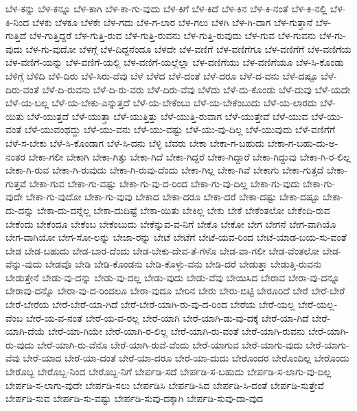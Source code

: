 {ಬೆಳ-ಕನ್ನು
ಬೆಳ-ಕನ್ನೂ
ಬೆಳ-ಕಾಗಿ
ಬೆಳ-ಕಾ-ಗು-ವುದು
ಬೆಳ-ಕಿಗೆ
ಬೆಳ-ಕಿದೆ
ಬೆಳ-ಕಿನ
ಬೆಳ-ಕಿ-ನಂತೆ
ಬೆಳ-ಕಿ-ನಲ್ಲಿ
ಬೆಳ-ಕಿ-ನಿಂದ
ಬೆಳಕು
ಬೆಳಕೂ
ಬೆಳಕೇ
ಬೆಳ-ಗದು
ಬೆಳ-ಗ-ಲಾರ
ಬೆಳ-ಗಲು
ಬೆಳಗಿ
ಬೆಳ-ಗಿ-ದಾಗ
ಬೆಳ-ಗುತ್ತಾನೆ
ಬೆಳ-ಗುತ್ತಿದೆ
ಬೆಳ-ಗುತ್ತಿದ್ದರೆ
ಬೆಳ-ಗುತ್ತಿ-ರುವ
ಬೆಳ-ಗುತ್ತಿ-ರುವನು
ಬೆಳ-ಗುತ್ತಿ-ರುವುದು
ಬೆಳ-ಗುವ
ಬೆಳ-ಗುವನು
ಬೆಳ-ಗು-ವುದು
ಬೆಳ-ಗು-ವುದೋ
ಬೆಳಗ್ಗೆ
ಬೆಳ-ದಿದ್ದನೆಂದೂ
ಬೆಳದೇ
ಬೆಳ-ವಣಿಗೆ
ಬೆಳ-ವಣಿಗೆಗೂ
ಬೆಳ-ವಣಿಗೆಗೆ
ಬೆಳ-ವಣಿಗೆಯ
ಬೆಳ-ವಣಿಗೆ-ಯನ್ನು
ಬೆಳ-ವಣಿಗೆ-ಯಲ್ಲಿ
ಬೆಳ-ವಣಿಗೆ-ಯಲ್ಲೆಲ್ಲಾ
ಬೆಳ-ವಣಿಗೆಯು
ಬೆಳ-ವಣಿಗೆಯೂ
ಬೆಳ-ಸಿ-ಕೊಂಡು
ಬೆಳಿಗ್ಗೆ
ಬೆಳಿದಿ
ಬೆಳಿ-ದಿರು
ಬೆಳಿ-ಸಿರು-ವೆವು
ಬೆಳೆ
ಬೆಳೆದ
ಬೆಳೆ-ದಂತೆ
ಬೆಳೆ-ದರೂ
ಬೆಳೆ-ದ-ವನು
ಬೆಳೆ-ದಷ್ಟೂ
ಬೆಳೆ-ದಿರು-ವಂತೆ
ಬೆಳೆ-ದಿ-ರುವನು
ಬೆಳೆ-ದಿ-ರು-ವರು
ಬೆಳೆ-ದಿರು-ವೆವು
ಬೆಳೆದು
ಬೆಳೆ-ದು-ಕೊಂಡು
ಬೆಳೆ-ದುವು
ಬೆಳೆ-ಯದೇ
ಬೆಳೆ-ಯ-ಬಲ್ಲ
ಬೆಳೆ-ಯ-ಬೇಕು-ಎನ್ನುತ್ತದೆ
ಬೆಳೆ-ಯ-ಬೇಕೆಂಬು
ಬೆಳೆ-ಯ-ಬೇಕೆಂಬುದು
ಬೆಳೆ-ಯ-ಲಾರದು
ಬೆಳೆ-ಯಿತು
ಬೆಳೆ-ಯುತ್ತದೆ
ಬೆಳೆ-ಯುತ್ತಾ
ಬೆಳೆ-ಯುತ್ತಿತ್ತು
ಬೆಳೆ-ಯುತ್ತಿ-ರುವಾಗ
ಬೆಳೆ-ಯುತ್ತೇವೆ
ಬೆಳೆ-ಯುವ
ಬೆಳೆ-ಯು-ವಂತೆ
ಬೆಳೆ-ಯುವಂಥದ್ದು
ಬೆಳೆ-ಯು-ವನು
ಬೆಳೆ-ಯು-ವಷ್ಟು
ಬೆಳೆ-ಯು-ವು-ದಿಲ್ಲ
ಬೆಳೆ-ಯುವುದು
ಬೆಳೆ-ವಣಿಗೆಗೆ
ಬೆಳೆ-ಸ-ಬೇಕು
ಬೆಳೆ-ಸಿ-ಕೊಂಡಾಗ
ಬೆಳೆ-ಸಿ-ದನು
ಬೆಳ್ಳಿ
ಬೆವರು
ಬೇಕಾ
ಬೇಕಾ-ಗ-ಬಹುದು
ಬೇಕಾ-ಗ-ಬಹು-ದು-ಅ-ನಂತರ
ಬೇಕಾ-ಗಲೀ
ಬೇಕಾಗಿ
ಬೇಕಾ-ಗಿತ್ತು
ಬೇಕಾ-ಗಿದೆ
ಬೇಕಾ-ಗಿದ್ದರೆ
ಬೇಕಾ-ಗಿದ್ದಾರೆ
ಬೇಕಾ-ಗಿದ್ದುವು
ಬೇಕಾ-ಗಿ-ರ-ಲಿಲ್ಲ
ಬೇಕಾ-ಗಿ-ರುವ
ಬೇಕಾ-ಗಿ-ರುವುದು
ಬೇಕಾ-ಗಿ-ರುವು-ದೆಂದು
ಬೇಕಾ-ಗಿಲ್ಲ
ಬೇಕಾ-ಗಿವೆ
ಬೇಕಾಗು
ಬೇಕಾ-ಗುತ್ತದೆ
ಬೇಕಾ-ಗುತ್ತವೆ
ಬೇಕಾ-ಗುವ
ಬೇಕಾ-ಗು-ವಷ್ಟು
ಬೇಕಾ-ಗು-ವು-ದ-ರಿಂದ
ಬೇಕಾ-ಗು-ವು-ದಿಲ್ಲ
ಬೇಕಾ-ಗು-ವುದು
ಬೇಕಾ-ಗು-ವುದೇ
ಬೇಕಾ-ಗು-ವುದೋ
ಬೇಕಾ-ಗು-ವುವು
ಬೇಕಾದ
ಬೇಕಾ-ದರೂ
ಬೇಕಾ-ದರೆ
ಬೇಕಾ-ದಷ್ಟು
ಬೇಕಾ-ದಷ್ಟೂ
ಬೇಕಾ-ದು-ದನ್ನು
ಬೇಕಾ-ದು-ದನ್ನೆಲ್ಲ
ಬೇಕಾ-ದುದಿಷ್ಟೆ
ಬೇಕಾ-ಯಿತು
ಬೇಕಿಲ್ಲ
ಬೇಕು
ಬೇಕೆ
ಬೇಕೆಂತಲೋ
ಬೇಕೆಂದಿ-ರುವ
ಬೇಕೆಂದು
ಬೇಕೆಂದೂ
ಬೇಕೆಂಬ
ಬೇಕೆಂಬುದು
ಬೇಕೆನ್ನುವ-ವ-ನಿಗೆ
ಬೇಕೊ
ಬೇಕೋ
ಬೇಗ
ಬೇಗನೆ
ಬೇಗ-ವಾಗಿಯೊ
ಬೇಗ-ವಾಗಿಯೋ
ಬೇಗ-ಸೋ-ಲನ್ನು
ಬೇಜಾ-ರನ್ನು
ಬೇಟೆ
ಬೇಟೆಗೆ
ಬೇಟೆ-ಯವ-ರಿಂದ
ಬೇಟೆ-ಯಾಡ-ಬಯ-ಸು-ವಂತೆ
ಬೇಡ
ಬೇಡ-ಬಹುದು
ಬೇಡ-ಬಾರ-ದೆಂದು
ಬೇಡ-ಬೇಕು-ದೇವ-ತೆ-ಗಳೊ
ಬೇಡ-ವಾ-ಗಲೀ
ಬೇಡ-ವೆಂತಲೋ
ಬೇಡ-ವೆನ್ನು-ವುದು
ಬೇಡವೊ
ಬೇಡಿ
ಬೇಡಿ-ಕೊಂಡನು
ಬೇಡಿ-ಕೊಳ್ಳು-ವನು
ಬೇಡಿ-ದರೆ
ಬೇಡುತ್ತಾ
ಬೇಡುತ್ತಿ-ರುವನು
ಬೇಡುತ್ತೇನೆ
ಬೇಡು-ವು-ದನ್ನು
ಬೇಡು-ವು-ದಲ್ಲ
ಬೇಡು-ವುದು
ಬೇಡು-ವೆವು
ಬೇಯಿಸಿದ
ಬೇರಾವ
ಬೇರಾ-ವು-ದನ್ನೂ
ಬೇರಾವು-ದನ್ನೊ
ಬೇರಾ-ವು-ದ-ರಿಂದಲೂ
ಬೇರಾ-ವುದೂ
ಬೇರಿನ
ಬೇರು
ಬೇರು-ಬಿಟ್ಟಿ
ಬೇರೂರಿದೆ
ಬೇರೆ
ಬೇರೆ-ಬೇರೆ
ಬೇರೆ-ಬೇರೆಯ
ಬೇರೆ-ಬೇರೆ-ಯಾ-ಗಿದೆ
ಬೇರೆ-ಬೇರೆ-ಯಾಗಿ-ರು-ವು-ದ-ರಿಂದ
ಬೇರೆಯ
ಬೇರೆ-ಯಲ್ಲ
ಬೇರೆ-ಯಲ್ಲ-ವೆಂಬ
ಬೇರೆ-ಯ-ವ-ನಂತೆ
ಬೇರೆ-ಯ-ವ-ರಲ್ಲ
ಬೇರೆ-ಯಾಗಿ
ಬೇರೆ-ಯಾಗಿ-ಡು-ವು-ದಕ್ಕೆ
ಬೇರೆ-ಯಾ-ಗಿದೆ
ಬೇರೆ-ಯಾಗಿ-ದೆಯೆ
ಬೇರೆ-ಯಾ-ಗಿಯೇ
ಬೇರೆ-ಯಾಗಿ-ರ-ಲಿಲ್ಲ
ಬೇರೆ-ಯಾಗಿ-ರು-ವಂತೆ
ಬೇರೆ-ಯಾಗಿ-ರುವನು
ಬೇರೆ-ಯಾಗಿ-ರು-ವುದು
ಬೇರೆ-ಯಾಗಿ-ರು-ವೆನೊ
ಬೇರೆ-ಯಾಗಿ-ರುವೆ-ವೆಂದು
ಬೇರೆ-ಯಾಗುವ
ಬೇರೆ-ಯಾಗು-ವುದು
ಬೇರೆ-ಯಾಗು-ವೆವು
ಬೇರೆ-ಯಾದ
ಬೇರೆ-ಯಾ-ದಂತೆ
ಬೇರೆ-ಯಾ-ದರೂ
ಬೇರೆ-ಯಾ-ದುದು
ಬೇರೊಂದರ
ಬೇರೊಂದಿಲ್ಲ
ಬೇರೊಂದು
ಬೇರೊಬ್ಬ
ಬೇರೊಬ್ಬ-ನಿಂದ
ಬೇರೊಬ್ಬ-ನಿಗೆ
ಬೇರ್ಪಡಿ-ಸದೆ
ಬೇರ್ಪಡಿ-ಸ-ಬಹುದು
ಬೇರ್ಪಡಿ-ಸ-ಲಾಗು-ವು-ದಿಲ್ಲ
ಬೇರ್ಪಡಿ-ಸ-ಲಾಗು-ವುದೇ
ಬೇರ್ಪಡಿ-ಸಲು
ಬೇರ್ಪಡಿಸಿ
ಬೇರ್ಪಡಿ-ಸಿದ
ಬೇರ್ಪಡಿ-ಸಿ-ದಂತೆ
ಬೇರ್ಪಡಿ-ಸುತ್ತೇವೆ
ಬೇರ್ಪಡಿ-ಸುವ
ಬೇರ್ಪಡಿ-ಸು-ವಷ್ಟು
ಬೇರ್ಪಡಿ-ಸುವು-ದಕ್ಕಾಗಿ
ಬೇರ್ಪಡಿ-ಸುವು-ದಾ-ವುದ
}
